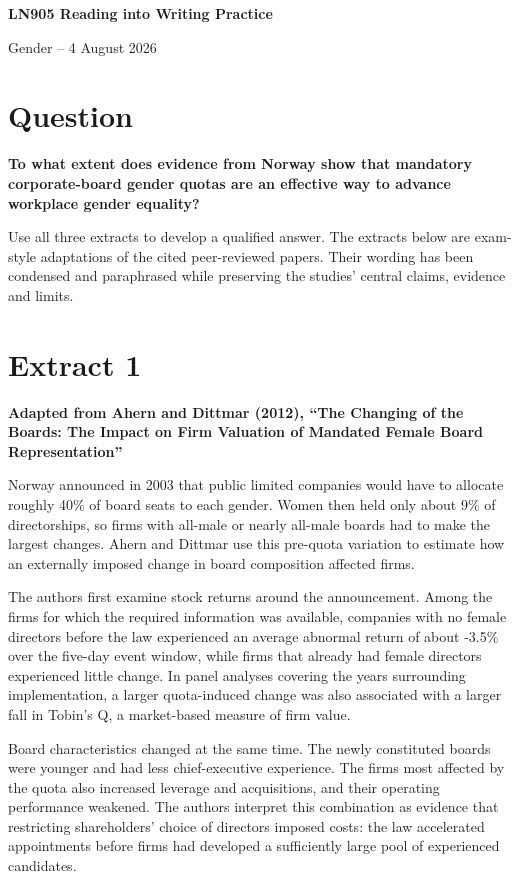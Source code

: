 \documentclass[11pt,a4paper]{article}
\newcommand{\sourceheading}[2]{%
  \section*{#1}
  \textbf{#2}\par\medskip
}
\begin{document}
\begin{center}
  {\Large\bfseries LN905 Reading into Writing Practice}\par
  \vspace{4pt}
  {\large Gender -- 4 August 2026}
\end{center}

\section*{Question}

\textbf{To what extent does evidence from Norway show that mandatory corporate-board gender quotas are an effective way to advance workplace gender equality?}

Use all three extracts to develop a qualified answer. The extracts below are exam-style adaptations of the cited peer-reviewed papers. Their wording has been condensed and paraphrased while preserving the studies' central claims, evidence and limits.

\sourceheading{Extract 1}{Adapted from Ahern and Dittmar (2012), ``The Changing of the Boards: The Impact on Firm Valuation of Mandated Female Board Representation''}

Norway announced in 2003 that public limited companies would have to allocate roughly 40\% of board seats to each gender. Women then held only about 9\% of directorships, so firms with all-male or nearly all-male boards had to make the largest changes. Ahern and Dittmar use this pre-quota variation to estimate how an externally imposed change in board composition affected firms.

The authors first examine stock returns around the announcement. Among the firms for which the required information was available, companies with no female directors before the law experienced an average abnormal return of about -3.5\% over the five-day event window, while firms that already had female directors experienced little change. In panel analyses covering the years surrounding implementation, a larger quota-induced change was also associated with a larger fall in Tobin's Q, a market-based measure of firm value.

Board characteristics changed at the same time. The newly constituted boards were younger and had less chief-executive experience. The firms most affected by the quota also increased leverage and acquisitions, and their operating performance weakened. The authors interpret this combination as evidence that restricting shareholders' choice of directors imposed costs: the law accelerated appointments before firms had developed a sufficiently large pool of experienced candidates.
\end{document}
